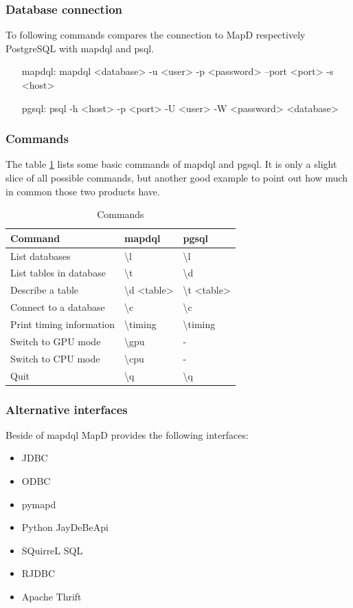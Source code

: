 \subsubsection{Database connection}
To following commands compares the connection to MapD respectively PostgreSQL with mapdql and psql.
\begin{itemize}[noitemsep]
 \item[mapdql:]  mapdql <database>  -u <user> -p <password> --port <port> -s <host>
 \item[pgsql:]  psql -h <host> -p <port> -U <user> -W <password> <database>
\end{itemize}

\subsubsection{Commands}
The table \ref{tab:commands} lists some basic commands of mapdql and pgsql.
It is only a slight slice of all possible commands, but another good example to point out how much in common those two products have.
\begin{table}[H]
\centering
\begin{tabular}{ |l|l|l| }
\hline
Command & mapdql & pgsql  \\
\hline
	List databases & \textbackslash l &  \textbackslash l \\
	List tables in database & \textbackslash t &  \textbackslash d \\
	Describe a table & \textbackslash d <table> & \textbackslash t <table> \\
	Connect to a database &  \textbackslash c  & \textbackslash c \\
	Print timing information & \textbackslash timing & \textbackslash timing \\
	Switch to GPU mode & \textbackslash gpu & - \\
	Switch to CPU mode & \textbackslash cpu & - \\
	Quit & \textbackslash q & \textbackslash q \\
\hline
\end{tabular}
\caption{Commands}
\label{tab:commands}
\end{table}

\subsubsection{Alternative interfaces}
Beside of mapdql MapD provides the following interfaces:
\begin{itemize}
 \item JDBC
 \item ODBC
 \item pymapd
 \item Python JayDeBeApi
 \item SQuirreL SQL
 \item RJDBC
 \item Apache Thrift
\end{itemize}
